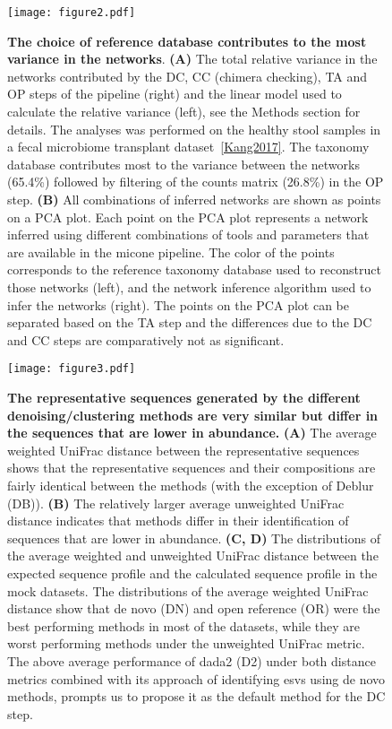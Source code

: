   \FloatBarrier
  \newpage

  \begin{figure}
    \centering
    \texttt{[image: figure2.pdf]}
  \end{figure}
  \begin{figure}
    \centering
      \caption{
      \textbf{The choice of reference database contributes to the most variance in the networks}.
      \textbf{(A)} The total relative variance in the networks contributed by the DC, CC (chimera checking), TA and OP steps of the pipeline (right) and the linear model used to calculate the relative variance (left), see the Methods section for details.
      The analyses was performed on the healthy stool samples in a fecal microbiome transplant dataset~\ref{Kang2017}.
      The taxonomy database contributes most to the variance between the networks (65.4\%) followed by filtering of the counts matrix (26.8\%) in the OP step.
      \textbf{(B)} All combinations of inferred networks are shown as points on a PCA plot.
      Each point on the PCA plot represents a network inferred using different combinations of tools and parameters that are available in the \ac{micone} pipeline.
      The color of the points corresponds to the reference taxonomy database used to reconstruct those networks (left), and the network inference algorithm used to infer the networks (right).
      The points on the PCA plot can be separated based on the TA step and the differences due to the DC and CC steps are comparatively not as significant.
    }
    \label{fig:figure2}
  \end{figure}
  \FloatBarrier
  \newpage

  \begin{figure}
    \centering
    \texttt{[image: figure3.pdf]}
    \caption{
      \textbf{The representative sequences generated by the different denoising/clustering methods are very similar but differ in the sequences that are lower in abundance.}
      \textbf{(A)} The average weighted UniFrac distance between the representative sequences shows that the representative sequences and their compositions are fairly identical between the methods (with the exception of Deblur (DB)).
      \textbf{(B)} The relatively larger average unweighted UniFrac distance indicates that methods differ in their identification of sequences that are lower in abundance.
      \textbf{(C, D)} The distributions of the average weighted and unweighted UniFrac distance between the expected sequence profile and the calculated sequence profile in the mock datasets.
      The distributions of the average weighted UniFrac distance show that de novo (DN) and open reference (OR) were the best performing methods in most of the datasets, while they are worst performing methods under the unweighted UniFrac metric.
      The above average performance of dada2 (D2) under both distance metrics combined with its approach of identifying \ac{esv}s using de novo methods, prompts us to propose it as the default method for the DC step.
    }
    \label{fig:figure3}
  \end{figure}
  \FloatBarrier
  \newpage


